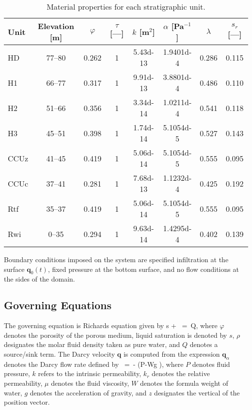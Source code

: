 \documentclass[12pt]{article}
\def\EQ#1\EN{\begin{equation}#1\end{equation}}
\newcommand{\eq}{\ =\ }
\newcommand{\p}{{\partial}}
\renewcommand{\a}{{\alpha}}
\newcommand{\bnabla}{\boldsymbol{\nabla}}
\newcommand{\bq}{\boldsymbol{q}}
\newcommand{\bz}{\boldsymbol{z}}
\begin{document}
\begin{table}[h]\centering
\caption{Material properties for each stratigraphic unit.}\label{tstrata}
\vspace{3mm}
\begin{tabular}{lccccccc}
\toprule
Unit & Elevation [m] & $\varphi$ & $\tau$ [---] & $k$ [m$^2$] & $\a$ [Pa$^{-1}$] & $\lambda$ & $s_r$ [---] \\
\midrule
HD   & 77--80 & 0.262 & 1 & 5.43d-13 & 1.9401d-4 & 0.286 & 0.115 \\ 
H1   & 66--77 & 0.317 & 1 & 9.91d-13 & 3.8801d-4 & 0.486 & 0.110\\
H2   & 51--66 & 0.356 & 1 & 3.34d-14 & 1.0211d-4 & 0.541 & 0.118\\
H3   & 45--51 & 0.398 & 1 & 1.74d-14 & 5.1054d-5 & 0.527 & 0.143\\
CCUz & 41--45 & 0.419 & 1 & 5.06d-14 & 5.1054d-5 & 0.555 & 0.095\\
CCUc & 37--41 & 0.281 & 1 & 7.68d-13 & 1.1232d-4 & 0.425 & 0.192\\
Rtf  & 35--37 & 0.419 & 1 & 5.06d-14 & 5.1054d-5 & 0.555 & 0.095\\
Rwi  & 0--35 & 0.294 & 1 & 9.63d-14 & 1.4295d-4 & 0.402 & 0.139\\
\bottomrule
\end{tabular}
\end{table}

Boundary conditions imposed on the system are specified infiltration at the surface $\bq_0(t)$, fixed pressure at the bottom surface, and no flow conditions at the sides of the domain.

\subsection{Governing Equations}

The governing equation is Richards equation given by
\EQ
\frac{\p}{\p t} \varphi s \rho + \bnabla\cdot\bq\rho \eq Q,
\EN
where $\varphi$ denotes the porosity of the porous medium, liquid saturation is denoted by $s$, $\rho$ designates the molar fluid density taken as pure water, and $Q$ denotes a source/sink term. The Darcy velocity $\bq$ is computed from the expression
$\bq_\a$ denotes the Darcy flow rate defined by
\EQ
\bq \eq - \bnabla \big(P-W\rho g \bz\big),
\EN
where $P$ denotes fluid pressure, $k$ refers to the intrinsic permeability, $k_r$ denotes the relative permeability, $\mu$ denotes the fluid viscosity, $W$ denotes the formula weight of water, $g$ denotes the acceleration of gravity, and $z$ designates the vertical of the position vector. 
\end{document}

